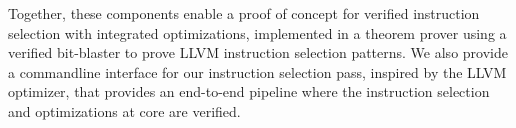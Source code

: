 \documentclass[review, anonymous, acmsmall, screen]{acmart}
\begin{document}
Together, these components enable a proof of concept for verified instruction selection with 
integrated optimizations, implemented in a theorem prover using a verified bit-blaster to prove LLVM 
instruction selection patterns. We also provide a commandline interface for our instruction 
selection pass, inspired by the LLVM optimizer, that provides an end-to-end pipeline where the 
instruction selection and optimizations at core are verified.










%
\end{document}
